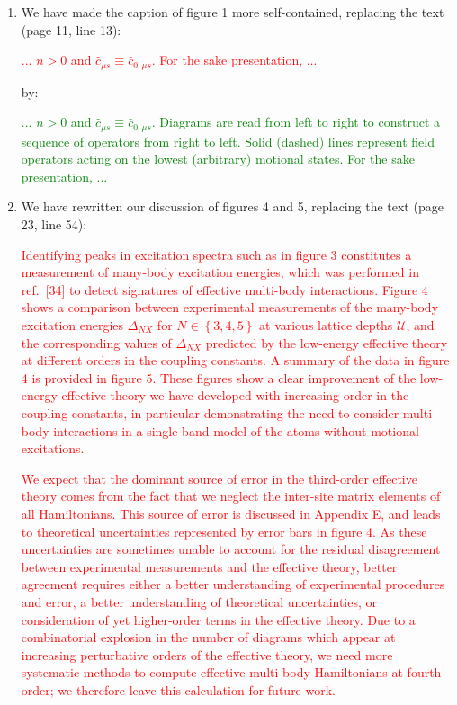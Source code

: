 \documentclass[preprint,showkeys,nofootinbib]{revtex4-1}
\renewcommand{\set}[1]{\left\{#1\right\}} %
\renewcommand{\c}{\hat{c}}
\newcommand{\U}{\mathcal{U}}
\newcommand{\1}{\mathds{1}}
\newcommand{\red}[1]{\textcolor{red}{#1}}
\newcommand{\green}[1]{\textcolor{green}{#1}}
\newcounter{point}
\newcommand{\step}{\stepcounter{point}\setcounter{enumi}{0}}
\begin{document}
\setcounter{point}{1}
\begin{enumerate}[label=(R2.\arabic{point}.\arabic*)]
  \step
\item We have made the caption of figure 1 more self-contained,
  replacing the text (page 11, line 13):

  \red{... $n>0$ and $\c_{\mu s}\equiv\c_{0,\mu s}$.  For the sake
    presentation, ...}

  by:

  \green{... $n>0$ and $\c_{\mu s}\equiv\c_{0,\mu s}$.  Diagrams are
    read from left to right to construct a sequence of operators from
    right to left.  Solid (dashed) lines represent field operators
    acting on the lowest (arbitrary) motional states.  For the sake
    presentation, ...}


  \step
\item We have rewritten our discussion of figures 4 and 5, replacing
  the text (page 23, line 54):

  \red{Identifying peaks in excitation spectra such as in figure 3
    constitutes a measurement of many-body excitation energies, which
    was performed in ref.~[34] to detect signatures of effective
    multi-body interactions.  Figure 4 shows a comparison between
    experimental measurements of the many-body excitation energies
    $\Delta_{NX}$ for $N\in\set{3,4,5}$ at various lattice depths
    $\U$, and the corresponding values of $\Delta_{NX}$ predicted by
    the low-energy effective theory at different orders in the
    coupling constants.  A summary of the data in figure 4 is provided
    in figure 5.  These figures show a clear improvement of the
    low-energy effective theory we have developed with increasing
    order in the coupling constants, in particular demonstrating the
    need to consider multi-body interactions in a single-band model of
    the atoms without motional excitations.}

  \red{We expect that the dominant source of error in the third-order
    effective theory comes from the fact that we neglect the
    inter-site matrix elements of all Hamiltonians.  This source of
    error is discussed in Appendix E, and leads to theoretical
    uncertainties represented by error bars in figure 4.  As these
    uncertainties are sometimes unable to account for the residual
    disagreement between experimental measurements and the effective
    theory, better agreement requires either a better understanding of
    experimental procedures and error, a better understanding of
    theoretical uncertainties, or consideration of yet higher-order
    terms in the effective theory.  Due to a combinatorial explosion
    in the number of diagrams which appear at increasing perturbative
    orders of the effective theory, we need more systematic methods to
    compute effective multi-body Hamiltonians at fourth order; we
    therefore leave this calculation for future work.}


\end{enumerate}
\end{document}
